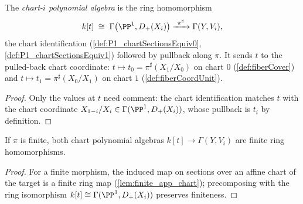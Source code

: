\begin{definition}
  \label{def:fiberPolyHom}
  \leanok
  The \emph{chart-\(i\) polynomial algebra} is the ring homomorphism
  \[
    k[t] \;\cong\; \Gamma\bigl(\PP^1, D_+(X_i)\bigr)
      \xrightarrow{\ \pi^{\sharp}\ } \Gamma(Y, V_i),
  \]
  the chart identification (\ref{def:P1_chartSectionsEquiv0},
  \ref{def:P1_chartSectionsEquiv1}) followed by pullback along \(\pi\). It sends \(t\)
  to the pulled-back chart coordinate: \(t \mapsto t_0 = \pi^{\sharp}(X_1/X_0)\) on
  chart \(0\) (\ref{def:fiberCover}) and \(t \mapsto t_1 = \pi^{\sharp}(X_0/X_1)\) on
  chart \(1\) (\ref{def:fiberCoordUnit}).
\end{definition}
\begin{proof}
  \leanok
  Only the values at \(t\) need comment: the chart identification matches \(t\) with
  the chart coordinate \(X_{1-i}/X_i \in \Gamma(\PP^1, D_+(X_i))\), whose pullback is
  \(t_i\) by definition.
\end{proof}

\begin{theorem}
  \label{thm:fiberPolyHom_finite}
  \leanok
  If \(\pi\) is finite, both chart polynomial algebras
  \(k[t] \to \Gamma(Y, V_i)\) are finite ring homomorphisms.
\end{theorem}
\begin{proof}
  \leanok
  For a finite morphism, the induced map on sections over an affine chart of the target
  is a finite ring map (\ref{lem:finite_app_chart}); precomposing with the ring
  isomorphism \(k[t] \cong \Gamma(\PP^1, D_+(X_i))\) preserves finiteness.
\end{proof}

